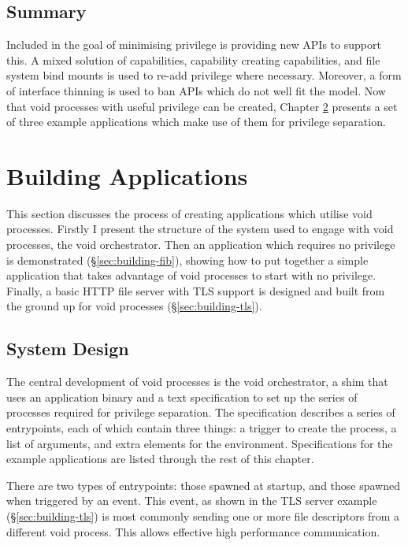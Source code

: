 \documentclass[12pt,a4paper,twoside]{report}
\begin{document}
\section{Summary}

Included in the goal of minimising privilege is providing new APIs to support this. A mixed solution of capabilities, capability creating capabilities, and file system bind mounts is used to re-add privilege where necessary. Moreover, a form of interface thinning is used to ban APIs which do not well fit the model. Now that void processes with useful privilege can be created, Chapter \ref{chap:building-apps} presents a set of three example applications which make use of them for privilege separation.


\chapter{Building Applications}
\label{chap:building-apps}

This section discusses the process of creating applications which utilise void processes. Firstly I present the structure of the system used to engage with void processes, the void orchestrator. Then an application which requires no privilege is demonstrated (§\ref{sec:building-fib}), showing how to put together a simple application that takes advantage of void processes to start with no privilege. Finally, a basic HTTP file server with TLS support is designed and built from the ground up for void processes (§\ref{sec:building-tls}).

\section{System Design}
\label{sec:system-design}

The central development of void processes is the void orchestrator, a shim that uses an application binary and a text specification to set up the series of processes required for privilege separation. The specification describes a series of entrypoints, each of which contain three things: a trigger to create the process, a list of arguments, and extra elements for the environment. Specifications for the example applications are listed through the rest of this chapter.

There are two types of entrypoints: those spawned at startup, and those spawned when triggered by an event. This event, as shown in the TLS server example (§\ref{sec:building-tls}) is most commonly sending one or more file descriptors from a different void process. This allows effective high performance communication.
\end{document}
